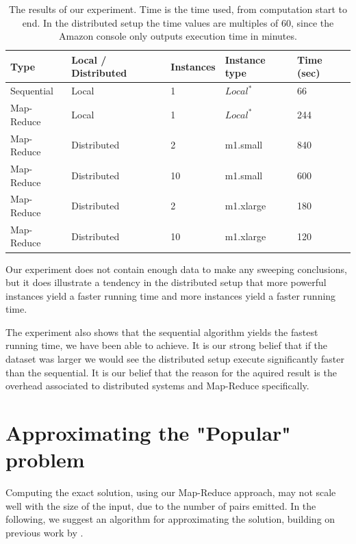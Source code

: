 \documentclass[a4paper,11pt]{article}
\begin{document}
\begin{table}[h!]

\begin{center}
    \begin{tabular}{|l|l|l|l|l|}
    \hline
    Type       & Local / Distributed & Instances & Instance type                     & Time (sec) \\ \hline
    Sequential & Local               & 1         & $Local^*$ & 66                 \\ \hline
    Map-Reduce & Local               & 1         & $Local^*$ & 244                 \\ \hline
    Map-Reduce & Distributed         & 2         & m1.small                          & 840                 \\ \hline
    Map-Reduce & Distributed         & 10        & m1.small                          & 600                 \\ \hline
    Map-Reduce & Distributed         & 2         & m1.xlarge                         & 180                 \\ \hline
    Map-Reduce & Distributed         & 10        & m1.xlarge                         & 120                 \\ \hline
    \end{tabular}
    \end{center}
    \caption{The results of our experiment. Time is the time used, from computation start to end. In the distributed setup the time values are multiples of 60, since the Amazon console only outputs execution time in minutes.}\label{tab:benchmark}
\end{table}
Our experiment does not contain enough data to make any sweeping conclusions, but it does illustrate a tendency in the distributed setup that more powerful instances yield a faster running time and more instances yield a faster running time. 

The experiment also shows that the sequential algorithm yields the fastest running time, we have been able to achieve. 
It is our strong belief that if the dataset was larger we would see the distributed setup execute significantly faster than the sequential. It is our belief that the reason for the aquired result is the overhead associated to distributed systems and Map-Reduce specifically.

\section{Approximating the "Popular" problem}
Computing the exact solution, using our Map-Reduce approach, may not scale well with the size of the input, due to the number of pairs emitted. In the following, we suggest an algorithm for approximating the solution, building on previous work by \cite{paper:amossen}.
\end{document}
